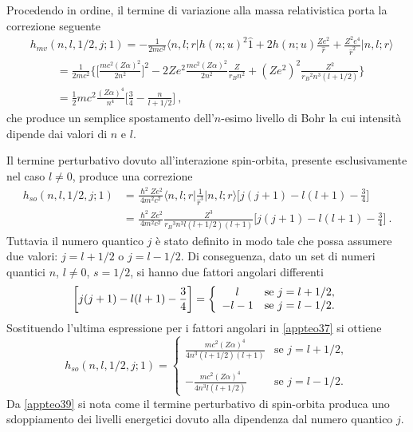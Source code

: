 \documentclass[12pt,a4paper]{report}
\numberwithin{equation}{section}
\numberwithin{section}{chapter}
\begin{document}
	Procedendo in ordine, il termine di variazione alla massa relativistica porta la correzione seguente
	\begin{align}
	\label{appteo36}
	&h_{mv}(n,l,1/2,j;1) = -\frac{1}{2mc^2}\bigg\langle n,l;r\bigg|h(n;u)^2\widehat{1} + 2h(n;u)\frac{Ze^2}{\widehat{r}} + \frac{Z^2e^4}{\widehat{r}^2}\bigg|n,l;r\bigg\rangle\\
	&\hspace{1cm}=\frac{1}{2mc^2}\bigg\lbrace\bigg[\frac{mc^2(Z\alpha)^2}{2n^2}\bigg]^2 - 2Ze^2\frac{mc^2(Z\alpha)^2}{2n^2}\frac{Z}{r_Bn^2} + (Ze^2)^2\frac{Z^2}{{r_B}^2n^3(l+1/2)}\bigg\rbrace\nonumber\\
	&\hspace{1cm}=\frac{1}{2}mc^2\frac{(Z\alpha)^4}{n^4}\bigg[\frac{3}{4} - \frac{n}{l+1/2}\bigg]~,\nonumber
	\end{align}
	che produce un semplice spostamento dell'$n$-esimo livello di Bohr la cui intensit\`a dipende dai valori di $n$ e $l$.
	
	Il termine perturbativo dovuto all'interazione spin-orbita, presente esclusivamente nel caso $l\neq0$, produce una correzione
	\begin{align}
	\label{appteo37}
	h_{so}(n,l,1/2,j;1) &= \frac{\hslash^2Ze^2}{4m^2c^2}\bigg\langle n,l;r\bigg|\frac{1}{\widehat{r}^3}\bigg|n,l;r\bigg\rangle\bigg[j(j+1) -l(l+1) -\frac{3}{4}\bigg]\\
	&=\frac{\hslash^2Ze^2}{4m^2c^2}\frac{Z^3}{{r_B}^3n^3l(l+1/2)(l+1)}\bigg[j(j+1) -l(l+1) -\frac{3}{4}\bigg]\nonumber~.
	\end{align}
	Tuttavia il numero quantico $j$ \`e stato definito in modo tale che possa assumere due valori: $j=l+1/2$ o $j=l-1/2$. Di conseguenza, dato un set di numeri quantici $n$, $l\neq0$, $s=1/2$, si hanno due fattori angolari differenti
	\begin{equation}
	\label{appteo38}
	\bigg[j(j+1) -l(l+1) -\frac{3}{4}\bigg] = \left\{
	\begin{array}{rl}
	l\hphantom{+1} &\text{se } j=l+1/2,\\
	-l-1 &\text{se } j=l-1/2.
	\end{array} \right.
	\end{equation}
	Sostituendo l'ultima espressione per i fattori angolari in \eqref{appteo37} si ottiene
	\begin{equation}
	\label{appteo39}
	h_{so}(n,l,1/2,j;1) =
	\begin{cases}
	\displaystyle{\frac{mc^2(Z\alpha)^4}{4n^3(l+1/2)(l+1)}} &\text{se } j=l+1/2,\\\\
	\displaystyle{-\frac{mc^2(Z\alpha)^4}{4n^3l(l+1/2)}} &\text{se } j=l-1/2.
	\end{cases}
	\end{equation}
	Da \eqref{appteo39} si nota come il termine perturbativo di spin-orbita produca uno sdoppiamento dei livelli energetici dovuto alla dipendenza dal numero quantico $j$.
	
\end{document}
